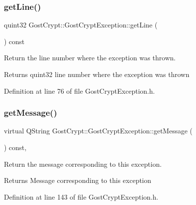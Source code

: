 \subsubsection{\texorpdfstring{get\+Line()}{getLine()}}
{\footnotesize\ttfamily quint32 Gost\+Crypt\+::\+Gost\+Crypt\+Exception\+::get\+Line (\begin{DoxyParamCaption}{ }\end{DoxyParamCaption}) const\hspace{0.3cm}{\ttfamily [inline]}}



Return the line number where the exception was thrown. 

\begin{DoxyReturn}{Returns}
quint32 line number where the exception was thrown 
\end{DoxyReturn}


Definition at line 76 of file Gost\+Crypt\+Exception.\+h.

\mbox{\label{class_gost_crypt_1_1_gost_crypt_exception_a5b4b89768abab6d495bb8e8ebb08fd29}} 
\subsubsection{\texorpdfstring{get\+Message()}{getMessage()}}
{\footnotesize\ttfamily virtual Q\+String Gost\+Crypt\+::\+Gost\+Crypt\+Exception\+::get\+Message (\begin{DoxyParamCaption}{ }\end{DoxyParamCaption}) const\hspace{0.3cm}{\ttfamily [inline]}, {\ttfamily [virtual]}}



Return the message corresponding to this exception. 

\begin{DoxyReturn}{Returns}
Message corresponding to this exception 
\end{DoxyReturn}


Definition at line 143 of file Gost\+Crypt\+Exception.\+h.

\mbox{\label{class_gost_crypt_1_1_gost_crypt_exception_a7f4c5d03898b8bb8337474c9f537ddee}} 
